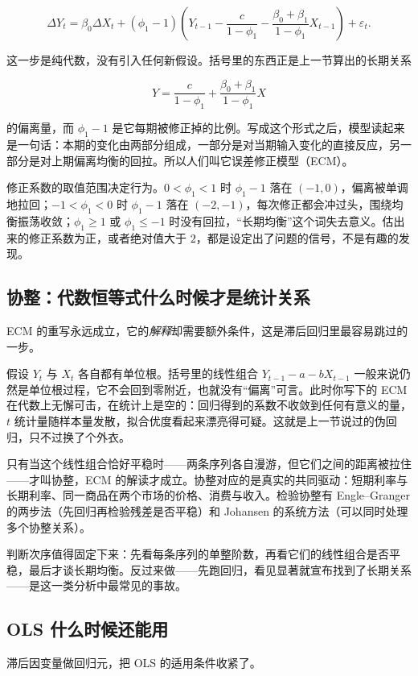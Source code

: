 \[
\Delta Y_t=\beta_0\Delta X_t
+(\phi_1-1)\left(Y_{t-1}-\frac{c}{1-\phi_1}-\frac{\beta_0+\beta_1}{1-\phi_1}X_{t-1}\right)+\varepsilon_t.
\]

这一步是纯代数，没有引入任何新假设。括号里的东西正是上一节算出的长期关系

\[
Y=\frac{c}{1-\phi_1}+\frac{\beta_0+\beta_1}{1-\phi_1}X
\]

的偏离量，而 \(\phi_1-1\) 是它每期被修正掉的比例。写成这个形式之后，模型读起来是一句话：本期的变化由两部分组成，一部分是对当期输入变化的直接反应，另一部分是对上期偏离均衡的回拉。所以人们叫它误差修正模型（ECM）。

修正系数的取值范围决定行为。\(0<\phi_1<1\) 时 \(\phi_1-1\) 落在 \((-1,0)\)，偏离被单调地拉回；\(-1<\phi_1<0\) 时 \(\phi_1-1\) 落在 \((-2,-1)\)，每次修正都会冲过头，围绕均衡振荡收敛；\(\phi_1\ge1\) 或 \(\phi_1\le-1\) 时没有回拉，``长期均衡''这个词失去意义。估出来的修正系数为正，或者绝对值大于 \(2\)，都是设定出了问题的信号，不是有趣的发现。

\subsection{协整：代数恒等式什么时候才是统计关系}

ECM 的重写永远成立，它的\emph{解释}却需要额外条件，这是滞后回归里最容易跳过的一步。

假设 \(Y_t\) 与 \(X_t\) 各自都有单位根。括号里的线性组合 \(Y_{t-1}-a-bX_{t-1}\) 一般来说仍然是单位根过程，它不会回到零附近，也就没有``偏离''可言。此时你写下的 ECM 在代数上无懈可击，在统计上是空的：回归得到的系数不收敛到任何有意义的量，\(t\) 统计量随样本量发散，拟合优度看起来漂亮得可疑。这就是上一节说过的伪回归，只不过换了个外衣。

只有当这个线性组合恰好平稳时——两条序列各自漫游，但它们之间的距离被拉住——才叫协整，ECM 的解读才成立。协整对应的是真实的共同驱动：短期利率与长期利率、同一商品在两个市场的价格、消费与收入。检验协整有 Engle--Granger 的两步法（先回归再检验残差是否平稳）和 Johansen 的系统方法（可以同时处理多个协整关系）。

判断次序值得固定下来：先看每条序列的单整阶数，再看它们的线性组合是否平稳，最后才谈长期均衡。反过来做——先跑回归，看见显著就宣布找到了长期关系——是这一类分析中最常见的事故。

\subsection{OLS 什么时候还能用}

滞后因变量做回归元，把 OLS 的适用条件收紧了。

